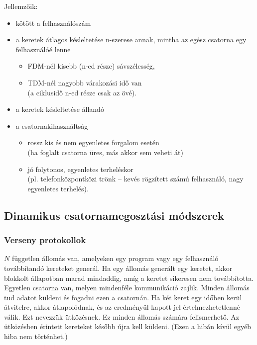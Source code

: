 \documentclass[12pt]{article}
\begin{document}
    \noindent Jellemzőik:
    \begin{itemize}[leftmargin=7.5mm]
        \renewcommand{\labelitemi}{$\vcenter{\hbox{\tiny$\bullet$}}$}
        \item kötött a felhasználószám
        \item a keretek átlagos késleltetése n-szerese annak, mintha az egész csatorna egy felhasználóé lenne
        \begin{itemize}[leftmargin=7.5mm]
            \renewcommand{\labelitemii}{$\vcenter{\hbox{\tiny$\circ$}}$}
            \item FDM-nél kisebb (n-ed része) sávszélesség,
            \item TDM-nél nagyobb várakozási idő van\\
            (a ciklusidő n-ed része csak az övé).
        \end{itemize}
        \item a keretek késleltetése állandó
        \item a csatornakihasználtság
        \begin{itemize}[leftmargin=7.5mm]
            \renewcommand{\labelitemii}{$\vcenter{\hbox{\tiny$\circ$}}$}
            \item rossz kis és nem egyenletes forgalom esetén\\
            (ha foglalt csatorna üres, más akkor sem veheti át)
            \item jó folytonos, egyenletes terheléskor\\
            (pl. telefonközpontközi trönk – kevés rögzített számú felhasználó, nagy egyenletes terhelés).
        \end{itemize}
    \end{itemize}

    \subsection*{Dinamikus csatornamegosztási módszerek}

    \subsubsection*{Verseny protokollok\\}

    $N$ független állomás van, amelyeken egy program vagy egy felhasználó továbbítandó kereteket generál. Ha egy állomás generált egy keretet, akkor blokkolt állapotban marad mindaddig, amíg a keretet sikeresen nem továbbította. Egyetlen csatorna van, melyen mindenféle kommunikáció zajlik. Minden állomás tud adatot küldeni és fogadni ezen a csatornán. Ha két keret egy időben kerül átvitelre, akkor átlapolódnak, és az eredményül kapott jel értelmezhetetlenné válik. Ezt nevezzük ütközésnek. Ez minden állomás számára felismerhető. Az ütközésben érintett kereteket később újra kell küldeni. (Ezen a hibán kívül egyéb hiba nem történhet.)\\
\end{document}

